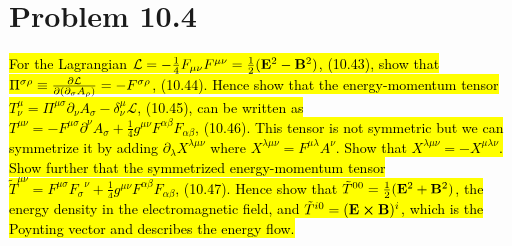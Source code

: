 \documentclass{article}
\begin{document}
\section*{Problem 10.4}
\begin{quoting}
    \hl{For the Lagrangian $\mathcal{L}=-\frac{1}{4}F_{\mu\nu}F^{\mu\nu}=\frac{1}{2}(\vb{E}^2-\vb{B}^2)$, (10.43), show that $\Pi^{\sigma\rho}\equiv\pdv{\mathcal{L}}{(\partial_\sigma A_\rho)}=-F^{\sigma\rho}$, (10.44). Hence show that the energy-momentum tensor $T^\mu_\nu=\Pi^{\mu\sigma} \partial_\nu A_\sigma-\delta^\mu_\nu \mathcal{L}$, (10.45), can be written as\\ $T^{\mu\nu}=-F^{\mu\sigma}\partial^\nu A_\sigma+\frac{1}{4}g^{\mu\nu}F^{\alpha\beta}F_{\alpha\beta}$, (10.46). This tensor is not symmetric but we can symmetrize it by adding $\partial_\lambda X^{\lambda\mu\nu}$ where $X^{\lambda\mu\nu}=F^{\mu\lambda}A^\nu$. Show that $X^{\lambda\mu\nu}=-X^{\mu\lambda\nu}$. Show further that the symmetrized energy-momentum tensor $\tilde{T}^{\mu\nu}=F^{\mu\sigma}{F_\sigma}^\nu+\frac{1}{4}g^{\mu\nu}F^{\alpha\beta}F_{\alpha\beta}$, (10.47). Hence show that $\tilde{T}^{00}=\frac{1}{2}(\vb{E}^2+\vb{B}^2)$, the energy density in the electromagnetic field, and $\tilde{T}^{i0}=(\vb{E}\cross\vb{B})^i$, which is the Poynting vector and describes the energy flow.}
\end{quoting}
\end{document}
